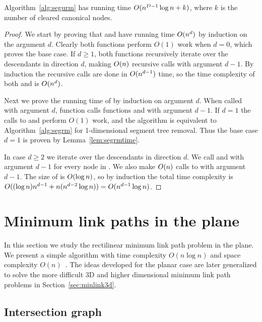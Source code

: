 \documentclass[english,gradu]{tktltiki2018}
\begin{document}
\begin{lem}\label{lem:segurmtime}Algorithm~\ref{alg:segurm} has running time $O(n^{D-1}\log n + k)$, where $k$ is the number of cleared canonical nodes.\end{lem}
\begin{proof}
We start by proving that \pdst and \recomp have running time $O(n^d)$ by induction on the argument $d$.
Clearly both functions perform $O(1)$ work when $d=0$, which proves the base case.
If $d\ge 1$, both functions recursively iterate over the descendants in direction $d$, making $O(n)$ recursive calls with argument $d-1$.
By induction the recursive calls are done in $O(n^{d-1})$ time, so the time complexity of both \pdst and \recomp is $O(n^d)$.

Next we prove the running time of \cleardt by induction on argument $d$.
When called with argument $d$, function \cleardt calls functions \pdst and \recomp with argument $d-1$.
If $d=1$ the calls to \pdst and \recomp perform $O(1)$ work, and the algorithm is equivalent to Algorithm~\ref{alg:segrm} for 1-dimensional segment tree removal.
Thus the base case $d=1$ is proven by Lemma~\ref{lem:segrmtime}.

In case $d\ge 2$ we iterate over the descendants in direction $d$.
We call \pdst and \recomp with argument $d-1$ for every node in .
We also make $O(n)$ calls to \cleardt with argument $d-1$.
The size of  is $O(\log n)$, so by induction the total time complexity is $O((\log n)n^{d-1} + n(n^{d-2}\log n))=O(n^{d-1}\log n)$.
\end{proof}



\section{Minimum link paths in the plane}\label{sec:minlink2d}

In this section we study the rectilinear minimum link path problem in the plane.
We present a simple algorithm with time complexity $O(n\log n)$ and space complexity $O(n)$~\cite{revisited}.
The ideas developed for the planar case are later generalized to solve the more difficult 3D and higher dimensional minimum link path problems in Section~\ref{sec:minlink3d}.

\subsection{Intersection graph}
\end{document}
